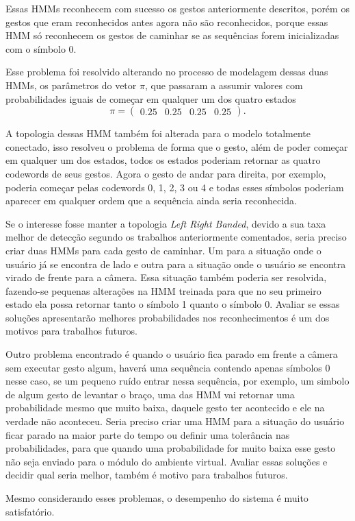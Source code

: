 Essas HMMs reconhecem com sucesso os gestos anteriormente descritos, porém os gestos que eram reconhecidos antes agora não são reconhecidos, porque essas HMM só reconhecem os gestos de caminhar se as sequências forem inicializadas com o símbolo 0.

Esse problema foi resolvido alterando no processo de modelagem dessas duas HMMs, os parâmetros do vetor \(\pi\), que passaram a assumir valores com probabilidades iguais de começar em qualquer um dos quatro estados
\[
 \pi =
 \begin{pmatrix}
  0.25 & 0.25 & 0.25 & 0.25
 \end{pmatrix}.
\]

A topologia dessas HMM também foi alterada para o modelo totalmente conectado, isso resolveu o problema de forma que o gesto, além de poder começar em qualquer um dos estados, todos os estados poderiam retornar as quatro codewords de seus gestos. Agora o gesto de andar para direita, por exemplo, poderia começar pelas codewords 0, 1, 2, 3 ou 4 e todas esses símbolos poderiam aparecer em qualquer ordem que a sequência ainda seria reconhecida.

Se o interesse fosse manter a topologia \textit{Left Right Banded}, devido a sua taxa melhor de detecção segundo os trabalhos anteriormente comentados, seria preciso criar duas HMMs para cada gesto de caminhar.
 Um para a situação onde o usuário já se encontra de lado e outra para a situação onde o usuário se encontra virado de frente para a câmera. Essa situação também poderia ser resolvida, fazendo-se pequenas alterações na HMM treinada para que no seu primeiro estado ela possa retornar tanto o símbolo 1 quanto o símbolo 0. Avaliar se essas soluções apresentarão melhores probabilidades nos reconhecimentos é um dos motivos para trabalhos futuros.

Outro problema encontrado é quando o usuário fica parado em frente a câmera sem executar gesto algum, haverá uma sequência contendo apenas símbolos 0 nesse caso, se um pequeno ruído entrar nessa sequência, por exemplo, um simbolo de algum gesto de levantar o braço, uma das HMM vai retornar uma probabilidade mesmo que muito baixa, daquele gesto ter acontecido e ele na verdade não aconteceu. Seria preciso criar uma HMM para a situação do usuário ficar parado na maior parte do tempo ou definir uma tolerância nas probabilidades, para que quando uma probabilidade for muito baixa esse gesto não seja enviado para o módulo do ambiente virtual. Avaliar essas soluções e decidir qual seria melhor, também é motivo para trabalhos futuros.

Mesmo considerando esses problemas, o desempenho do sistema é muito satisfatório.

